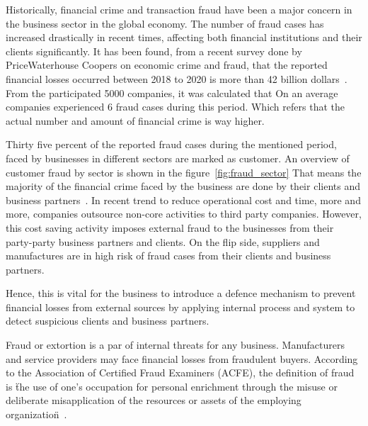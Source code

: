 
Historically, financial crime and transaction fraud have been a major concern in the business sector in the global economy. The number of fraud cases has increased drastically in recent times, affecting both financial institutions and their clients significantly. It has been found, from a recent survey done by PriceWaterhouse Coopers on economic crime and fraud, that the reported financial losses occurred between 2018 to 2020 is more than 42 billion dollars~\cite{PwC.Crime.Survey}. From the participated 5000 companies, it was calculated that On an average companies experienced 6 fraud cases during this period. Which refers that the actual number and amount of financial crime is way higher.   


Thirty five percent of the reported fraud cases during the mentioned period, faced by businesses in different sectors are marked as customer. An overview of customer fraud by sector is shown in the figure~\ref{fig:fraud_sector}  That means the majority of the financial crime faced by the business are done by their clients and business partners~\cite{PwC.Crime.Survey}. In recent trend to reduce operational cost and time, more and more, companies outsource non-core activities to third party companies. However, this cost saving activity imposes external fraud to the businesses from their party-party business partners and clients. On the flip side, suppliers and manufactures are in high risk of fraud cases from their clients and business partners. 


Hence, this is vital for the business to introduce a defence mechanism to prevent financial losses from external sources by applying internal process and system to detect suspicious clients and business partners. 

Fraud or extortion is a par of internal threats for any business. Manufacturers and service providers may face financial losses from fraudulent buyers. According to the Association of Certified Fraud Examiners (ACFE), the definition of fraud is \"the use of one’s occupation for personal enrichment through the misuse or deliberate misapplication of the resources or assets of the employing organization\"~\cite{kassem_2014}.

